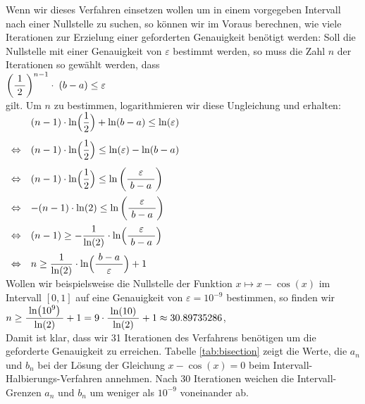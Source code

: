 Wenn wir dieses Verfahren einsetzen
wollen um in einem vorgegeben Intervall nach einer Nullstelle zu suchen, so k\"onnen wir im
Voraus berechnen, wie viele Iterationen zur Erzielung einer geforderten Genauigkeit
ben\"otigt werden:  Soll die Nullstelle mit einer Genauigkeit von $\varepsilon$ bestimmt
werden, so muss die Zahl $n$ der Iterationen so gew\"ahlt werden, dass 
\\[0.2cm]
\hspace*{1.3cm}
$\left(\displaystyle\frac{\;\displaystyle1\;}{\;\displaystyle2\;}\right)^{n-1} \cdot \;(b - a) \leq \varepsilon$
\\[0.2cm]
gilt.  Um $n$ zu bestimmen, logarithmieren wir diese Ungleichung und erhalten:
\\[0.2cm]
\hspace*{1.3cm}
$
\begin{array}[t]{ll} 
                &\displaystyle (n-1) \cdot \ln\Bigl(\frac{1}{2}\Bigr) + \ln(b - a) \leq \ln(\varepsilon) \\[0.4cm]
\Leftrightarrow &\displaystyle (n-1) \cdot \ln\Bigl(\frac{1}{2}\Bigr) \leq \ln(\varepsilon) - \ln(b - a) \\[0.4cm]
\Leftrightarrow &\displaystyle (n-1) \cdot \ln\Bigl(\frac{1}{2}\Bigr) \leq \ln\left(\displaystyle\frac{\;\displaystyle\varepsilon\;}{\;\displaystyle b - a\;}\right) \\[0.4cm]
\Leftrightarrow &\displaystyle - (n-1) \cdot \ln(2) \leq \ln\left(\displaystyle\frac{\;\displaystyle\varepsilon\;}{\;\displaystyle b - a\;}\right) \\[0.4cm]
\Leftrightarrow &\displaystyle (n-1) \geq - \frac{1}{\ln(2)} \cdot \ln\Bigl(\displaystyle\frac{\;\displaystyle\varepsilon\;}{\;\displaystyle b - a\;}\Bigr) \\[0.4cm]
\Leftrightarrow &\displaystyle n \geq \frac{1}{\ln(2)} \cdot \ln\Bigl(\displaystyle\frac{\;\displaystyle b - a\;}{\;\displaystyle\varepsilon\;}\Bigr) + 1
\end{array}
$
\\[0.4cm]
Wollen wir beispielsweise die Nullstelle der Funktion $x \mapsto x - \cos(x)$ im Intervall
$[0,1]$ auf eine Genauigkeit von $\varepsilon = 10^{-9}$ bestimmen, so finden wir
\\[0.2cm]
\hspace*{1.3cm}
$n \geq \displaystyle\frac{\;\displaystyle\ln\bigl(10^{9}\bigr)\;}{\;\displaystyle\ln(2)\;} + 1 = 9 \cdot \displaystyle\frac{\;\displaystyle\ln(10)\;}{\;\displaystyle\ln(2)\;} + 1 \approx 30.89735286$,
\\[0.2cm]
Damit ist klar, dass wir 31 Iterationen des Verfahrens ben\"otigen um die geforderte
Genauigkeit zu erreichen.  Tabelle \ref{tab:bisection} zeigt die Werte, die $a_n$ und
$b_n$ bei der L\"osung der Gleichung $x - \cos(x) = 0$ beim Intervall-Halbierungs-Verfahren
annehmen. Nach 30 Iterationen weichen die Intervall-Grenzen $a_n$ und $b_n$ um weniger als
$10^{-9}$ voneinander ab.

